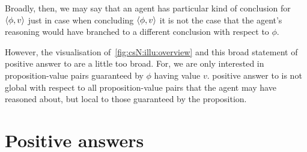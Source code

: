 \begin{note}
  Broadly, then, we may say that an agent has {\color{red} particular kind of conclusion} for \(\langle \phi, v \rangle\) just in case when concluding \(\langle \phi, v \rangle\) it is not the case that the agent's reasoning would have branched to a different conclusion with respect to \(\phi\).

  However, the visualisation of~\autoref{fig:csN:illu:overview} and this broad statement of {\color{red} positive answer to \qzS{}} are a little too broad.
  For, we are only interested in proposition-value pairs guaranteed by \(\phi\) having value \(v\).
  {\color{red} positive answer to \qzS{}} is not global with respect to all proposition-value pairs that the agent may have reasoned about, but local to those guaranteed by the proposition.
\end{note}

\section{Positive answers}
\label{sec:positive-answers}

